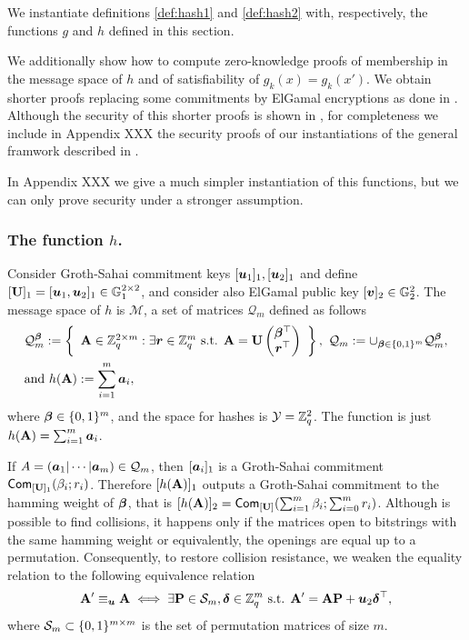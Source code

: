 
We instantiate definitions \ref{def:hash1} and \ref{def:hash2}  with, respectively, the functions $g$ and $h$ defined in this section. 

We additionally show how to compute zero-knowledge proofs of membership in the message space of $h$ and of satisfiability of $g_k(x)=g_k(x')$.
We obtain shorter proofs replacing some commitments by ElGamal encryptions as done in \cite{PKC:EscGro14}. Although the security of this shorter proofs is shown in \cite{PKC:EscGro14}, for completeness we include in Appendix XXX the security proofs of our instantiations of the general framwork described in \cite{PKC:EscGro14}.

In Appendix XXX we give a much simpler instantiation of this functions, but we can only prove security under a stronger assumption. 

\subsubsection{The function $h$.} Consider Groth-Sahai commitment keys $[{\boldsymbol{u}}_1]_1,[{\boldsymbol{u}}_2]_1$ and define $[\mathbf{{U}}]_1 = [{\boldsymbol{u}}_1,{\boldsymbol{u}}_2]_1\in\mathbb{G}_1^{2\times 2}$,  and consider also ElGamal public key $[{\boldsymbol{v}}]_2\in\mathbb{G}_2^2$. The message space of $h$ is $\mathcal{M}$, a set of matrices $\mathcal{Q}_m$ defined as follows
\begin{align*}
&\mathcal{Q}_m^{\boldsymbol{\beta}} := \left\{
\begin{array}{c}
\mathbf{{A}} \in \mathbb{Z}_q^{2\times m}:
\exists {\boldsymbol{r}}\in\mathbb{Z}_q^m\text{ s.t. }
{\mathbf{{A}} = \mathbf{{U}}\left(\begin{matrix}{\boldsymbol{\beta}}^\top\\{\boldsymbol{r}}^\top\end{matrix}\right)
}
\end{array}\right\},
\ \mathcal{Q}_m := \cup_{{\boldsymbol{\beta}}\in\{0,1\}^m} \mathcal{Q}_m^{\boldsymbol{\beta}},\\
&\text{and } h(\mathbf{{A}}):= \sum_{i=1}^m{\boldsymbol{a}}_i,
\end{align*}
where ${\boldsymbol{\beta}}\in\{0,1\}^m$, and the space for hashes is $\mathcal{Y}=\mathbb{Z}_q^2$. The function is just $h(\mathbf{{A}})=\sum_{i=1}^m {\boldsymbol{a}}_i$.

If $A=({\boldsymbol{a}}_1|\cdots|{\boldsymbol{a}}_m)\in\mathcal{Q}_m$, then $[{\boldsymbol{a}}_i]_1$ is a Groth-Sahai commitment $\mathsf{Com}_{[\mathbf{{U}}]_1}(\beta_i;r_i)$.
Therefore $[h(\mathbf{{A}})]_1$ outputs a Groth-Sahai commitment to the hamming weight of ${\boldsymbol{\beta}}$, that is $[h(\mathbf{{A}})]_2 = \mathsf{Com}_{[\mathbf{{U}}]}(\sum_{i=1}^m \beta_i;\sum_{i=0}^m r_i)$. Although is possible to find collisions, it happens only if the matrices open to bitstrings with the same hamming weight or equivalently, the openings are equal up to a permutation. Consequently, to restore collision resistance, we weaken the equality relation to the following equivalence relation
$$
\mathbf{{A}}' \equiv_{\boldsymbol{u}} \mathbf{{A}} \iff \exists \mathbf{{P}}\in\mathcal{S}_m, {\boldsymbol{\delta}}\in\mathbb{Z}_q^m \text{ s.t. } \mathbf{{A}}' = \mathbf{{A}}\mathbf{{P}} + {\boldsymbol{u}}_2{\boldsymbol{\delta}}^\top,
$$
where $\mathcal{S}_m\subset \{0,1\}^{m\times m}$ is the set of permutation matrices of size $m$.

